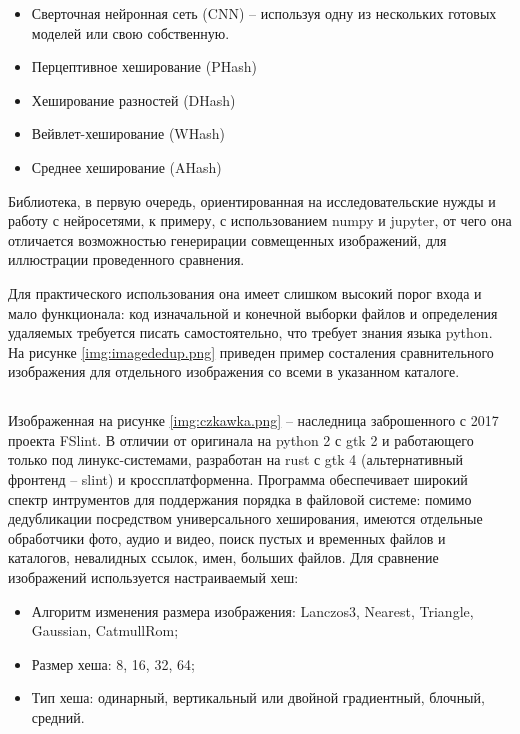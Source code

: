 \documentclass[variant=courcework]{bsuir}
\begin{document}
\begin{itemize}
    \item Сверточная нейронная сеть (CNN) -- используя одну из нескольких
          готовых моделей или свою собственную.
    \item Перцептивное хеширование (PHash)
    \item Хеширование разностей (DHash)
    \item Вейвлет-хеширование (WHash)
    \item Среднее хеширование (AHash)
\end{itemize}

Библиотека, в первую очередь, ориентированная на исследовательские нужды и
работу с нейросетями, к примеру, с использованием numpy и jupyter, от чего она
отличается возможностью генерирации совмещенных изображений, для иллюстрации
проведенного сравнения.

Для практического использования она имеет слишком высокий порог входа и мало
функционала: код изначальной и конечной выборки файлов и определения удаляемых
требуется писать самостоятельно, что требует знания языка python. На рисунке
\ref{img:imagededup.png} приведен пример состаления сравнительного изображения
для отдельного изображения со всеми в указанном каталоге.
\\


\subsection*{}

Изображенная на рисунке \ref{img:czkawka.png}  -- наследница
заброшенного с 2017 проекта FSlint. В отличии от оригинала на python 2 с gtk 2 и
работающего только под линукс-системами, разработан на rust с gtk 4
(альтернативный фронтенд -- slint) и кроссплатформенна. Программа обеспечивает
широкий спектр интрументов для поддержания порядка в файловой системе: помимо
дедубликации посредством универсального хеширования, имеются отдельные
обработчики фото, аудио и видео, поиск пустых и временных файлов и каталогов,
невалидных ссылок, имен, больших файлов. Для сравнение изображений используется
настраиваемый хеш:

\begin{itemize}
    \item Алгоритм изменения размера изображения: Lanczos3, Nearest, Triangle,
          Gaussian, CatmullRom;
    \item Размер хеша: 8, 16, 32, 64;
    \item Тип хеша: одинарный, вертикальный или двойной градиентный, блочный,
          средний.
\end{itemize}
\end{document}
